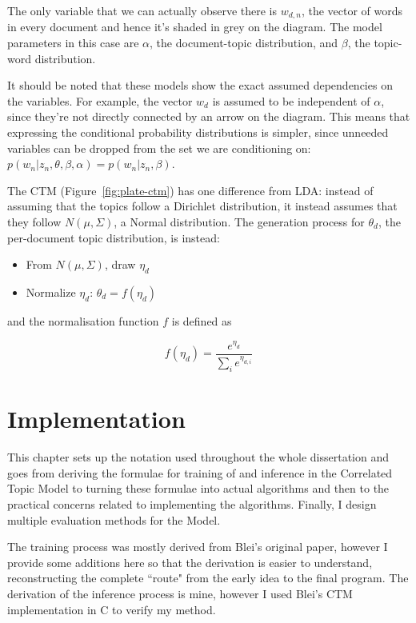 \documentclass[12pt,a4paper,twoside,openright]{report}
\begin{document}
The only variable that we can actually observe there is $w_{d, n}$, the vector of words in every document and hence it's shaded in grey on the diagram. The model parameters in this case are $\alpha$, the document-topic distribution, and $\beta$, the topic-word distribution.

It should be noted that these models show the exact assumed dependencies on the variables. For example, the vector $w_d$ is assumed to be independent of $\alpha$, since they're not directly connected by an arrow on the diagram. This means that expressing the conditional probability distributions is simpler, since unneeded variables can be dropped from the set we are conditioning on: $p(w_n | z_n, \theta, \beta, \alpha) = p(w_n | z_n, \beta)$.

The CTM (Figure~\ref{fig:plate-ctm}) has one difference from LDA: instead of assuming that the topics follow a Dirichlet distribution, it instead assumes that they follow $N(\mu, \Sigma)$, a Normal distribution. The generation process for $\theta_d$, the per-document topic distribution, is instead:

\begin{itemize}[noitemsep]
\item From $N(\mu, \Sigma)$, draw $\eta_d$
\item Normalize $\eta_d$: $\theta_d = f(\eta_d) $
\end{itemize}

and the normalisation function $f$ is defined as 

\begin{equation}
f(\eta_d) = \frac{e^{\eta_d}}{\sum\limits_i e^{\eta_{d, i}}}
\end{equation}

\chapter{Implementation}

This chapter sets up the notation used throughout the whole dissertation and goes from deriving the formulae for training of and inference in the Correlated Topic Model to turning these formulae into actual algorithms and then to the practical concerns related to implementing the algorithms. Finally, I design multiple evaluation methods for the Model.

The training process was mostly derived from Blei's original paper, however I provide some additions here so that the derivation is easier to understand, reconstructing the complete ``route" from the early idea to the final program. The derivation of the inference process is mine, however I used Blei's CTM implementation in C to verify my method.
\end{document}
